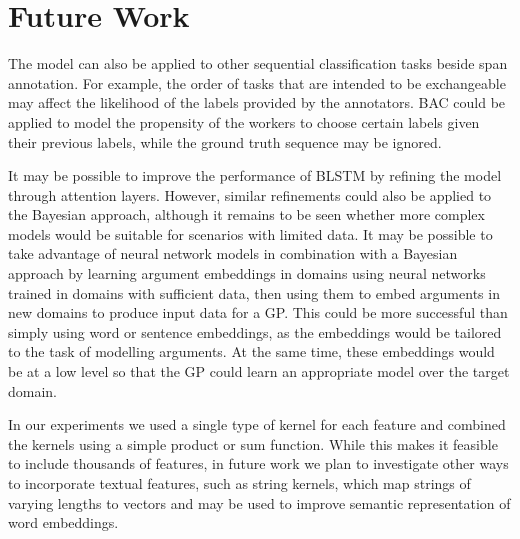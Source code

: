 \section{Future Work}

The model can also be applied to other sequential classification tasks beside span annotation.
For example, the order of tasks that are intended to be exchangeable may affect the likelihood
of the labels provided by the annotators\cite{mathur2017}. BAC could be applied to model the 
propensity of the workers to choose certain labels given their previous labels, while the 
ground truth sequence may be ignored.

It may be possible to improve the performance of BLSTM by refining the model through attention layers. However,  similar refinements could also be applied to the Bayesian approach, 
although it remains to be seen whether more complex models would be suitable for scenarios with limited data. 
It may be possible to take advantage of neural network models in combination with a Bayesian approach
by learning argument embeddings in domains using neural networks trained in domains with sufficient data, then 
using them to embed arguments in new domains to produce input data for a GP. This could be more successful than
simply using word or sentence embeddings, as the embeddings would be tailored to the task of modelling 
arguments. At the same time, these embeddings would be at a low level so that the GP could learn an appropriate model over the target domain.

In our experiments we used a single type of kernel for each feature and combined the kernels using a simple product or sum function.
While this makes it feasible to include thousands of features, in future work we plan to investigate other 
ways to incorporate textual features, such as string kernels, which map strings of varying lengths to vectors 
and may be used to improve semantic representation of word embeddings\cite{lodhi_text_2002}.
